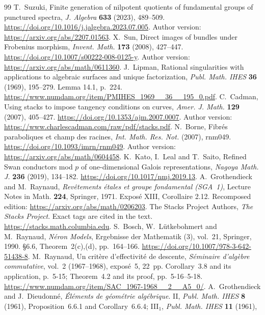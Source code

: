 \documentclass[11pt]{article}
\theoremstyle{remark}\newtheorem{remark}[theorem]{Remark}
\begin{document}
\begin{thebibliography}{99}
 T.~Suzuki, Finite generation of nilpotent quotients of fundamental groups of punctured spectra, \emph{J. Algebra} \textbf{633} (2023), 489--509. \url{https://doi.org/10.1016/j.jalgebra.2023.07.005}. Author version: \url{https://arxiv.org/abs/2207.01563}.
 X.~Sun, Direct images of bundles under Frobenius morphism, \emph{Invent. Math.} \textbf{173} (2008), 427--447. \url{https://doi.org/10.1007/s00222-008-0125-y}. Author version: \url{https://arxiv.org/abs/math/0611360}.
 J.~Lipman, Rational singularities with applications to algebraic surfaces and unique factorization, \emph{Publ. Math. IHES} \textbf{36} (1969), 195--279. Lemma 14.1, p.~224. \url{https://www.numdam.org/item/PMIHES_1969__36__195_0.pdf}.
 C.~Cadman, Using stacks to impose tangency conditions on curves, \emph{Amer. J. Math.} \textbf{129} (2007), 405--427. \url{https://doi.org/10.1353/ajm.2007.0007}. Author version: \url{https://www.charlescadman.com/raw/pdf/stacks.pdf}.
 N.~Borne, Fibr\'es paraboliques et champ des racines, \emph{Int. Math. Res. Not.} (2007), rnm049. \url{https://doi.org/10.1093/imrn/rnm049}. Author version: \url{https://arxiv.org/abs/math/0604458}.
 K.~Kato, I.~Leal and T.~Saito, Refined Swan conductors mod $p$ of one-dimensional Galois representations, \emph{Nagoya Math. J.} \textbf{236} (2019), 134--182. \url{https://doi.org/10.1017/nmj.2019.13}.
 A.~Grothendieck and M.~Raynaud, \emph{Rev\^etements \'etales et groupe fondamental (SGA~1)}, Lecture Notes in Math. \textbf{224}, Springer, 1971. Expos\'e XIII, Corollaire 2.12. Recomposed edition: \url{https://arxiv.org/abs/math/0206203}.
 The Stacks Project Authors, \emph{The Stacks Project}. Exact tags are cited in the text. \url{https://stacks.math.columbia.edu}.
S.~Bosch, W.~L\"utkebohmert and M.~Raynaud,
\emph{N\'eron Models}, Ergebnisse der Mathematik (3), vol.~21,
Springer, 1990. \S6.6, Theorem~2(c),(d), pp.~164--166.
\url{https://doi.org/10.1007/978-3-642-51438-8}.
M.~Raynaud, Un crit\`ere d'effectivit\'e de descente,
\emph{S\'eminaire d'alg\`ebre commutative}, vol.~2 (1967--1968),
expos\'e~5, 22~pp. Corollary~3.8 and its application, p.~5-15;
Theorem~4.2 and its proof, pp.~5-16--5-18.
\url{https://www.numdam.org/item/SAC_1967-1968__2__A5_0/}.
A.~Grothendieck and J.~Dieudonn\'e,
\emph{\'El\'ements de g\'eom\'etrie alg\'ebrique}.
II, \emph{Publ. Math. IHES} \textbf{8} (1961),
Proposition~6.6.1 and Corollary~6.6.4;
III$_1$, \emph{Publ. Math. IHES} \textbf{11} (1961),

\end{thebibliography}
\end{document}
